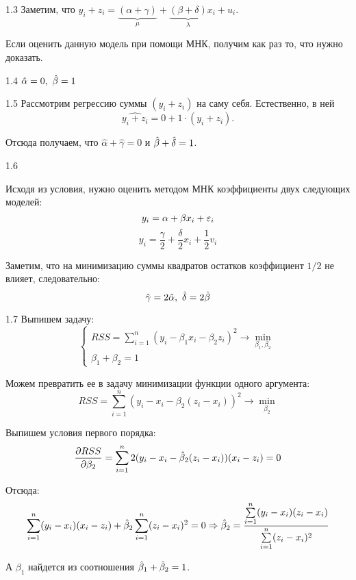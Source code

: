 \protect \hypertarget {soln:1.3}{}
\begin{solution}{{1.3}}
Заметим, что $y_i + z_i = \underbrace{(\alpha + \gamma)}_{\mu} + \underbrace{(\beta+\delta)}_{\lambda}x_i + u_i$.

Если оценить данную модель при помощи МНК, получим как раз то, что нужно доказать.
\end{solution}
\protect \hypertarget {soln:1.4}{}
\begin{solution}{{1.4}}
\(\hat{\alpha} = 0, \ \hat{\beta} = 1 \)
\end{solution}
\protect \hypertarget {soln:1.5}{}
\begin{solution}{{1.5}}
Рассмотрим регрессию суммы $(y_i + z_i)$ на саму себя. Естественно, в ней
\[
\widehat{y_i + z_i} = 0 + 1 \cdot (y_i + z_i).
\]

Отсюда получаем, что $\hat{\alpha} + \hat{\gamma} = 0$ и $\hat{\beta} + \hat{\delta} = 1$.
\end{solution}
\protect \hypertarget {soln:1.6}{}
\begin{solution}{{1.6}}

Исходя из условия, нужно оценить методом МНК коэффициенты двух следующих моделей:
\[y_i = \alpha + \beta x_i + \varepsilon_i \]
\[y_i = \frac{\gamma}{2} + \frac{\delta}{2} x_i + \frac{1}{2} v_i \]

Заметим, что на минимизацию суммы квадратов остатков коэффициент \(1/2\) не влияет, следовательно:
\[\hat{\gamma} = 2\hat{\alpha}, \ \hat{\delta} = 2 \hat{\beta}  \]

\end{solution}
\protect \hypertarget {soln:1.7}{}
\begin{solution}{{1.7}}
Выпишем задачу:
\[
\begin{cases}
RSS = \sum\limits_{i=1}^{n}(y_i - \beta_1x_i - \beta_2z_i)^2 \rightarrow \min\limits_{\beta_1, \beta_2}\\
\beta_1 + \beta_2 = 1
\end{cases}
\]

Можем превратить ее в задачу минимизации функции одного аргумента:
\[
RSS =  \sum\limits_{i=1}^{n}(y_i - x_i - \beta_2(z_i-x_i))^2 \rightarrow \min_{\beta_2}
\]

Выпишем условия первого порядка:
\[
\frac{\partial RSS}{\partial \beta_2} = \sum\limits_{i=1}^{n}2(y_i-x_i-\hat{\beta}_2(z_i-x_i))(x_i-z_i)=0
\]

Отсюда:
\[
\sum\limits_{i=1}^{n}(y_i-x_i)(x_i-z_i) + \hat{\beta}_2\sum\limits_{i=1}^{n}(z_i-x_i)^2 = 0 \Rightarrow \hat{\beta}_2 = \frac{\sum\limits_{i=1}^n (y_i-x_i)(z_i-x_i)}{\sum\limits_{i=1}^n (z_i-x_i)^2}
\]

А $\beta_1$ найдется из соотношения $\hat{\beta}_1+\hat{\beta}_2 = 1$.

\end{solution}
